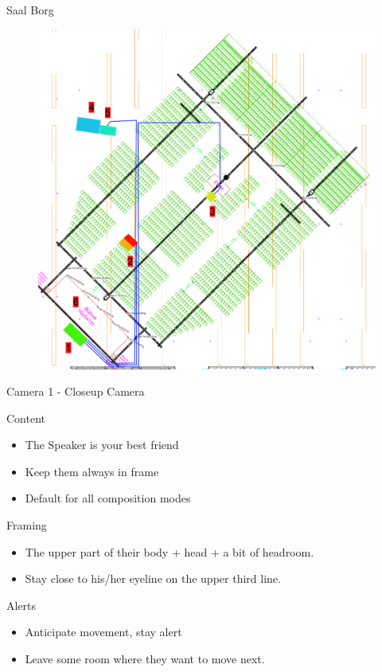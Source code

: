 \documentclass[aspectratio=169]{beamer}
\begin{document}
\begin{frame}{Saal Borg}
	\begin{figure} 
		\centering
		\includegraphics[height=0.9\textheight]{images/SaalB.png}
	\end{figure}
\end{frame}

\begin{frame}{Camera 1 - Closeup Camera}
		\begin{block}{Content}
			\begin{itemize}
				\item The Speaker is your best friend
				\item Keep them always in frame
				\item Default for all composition modes
			\end{itemize}
		\end{block}
		
		\begin{block}{Framing}
			\begin{itemize}
				\item The upper part of their body + head + a bit of headroom.
				\item Stay close to his/her eyeline on the upper third line.
			\end{itemize}
		\end{block}

		\begin{alertblock}{Alerts}
			\begin{itemize}
				\item Anticipate movement, stay alert
				\item Leave some room where they want to move next.
			\end{itemize}
		\end{alertblock}
\end{frame}
\end{document}
